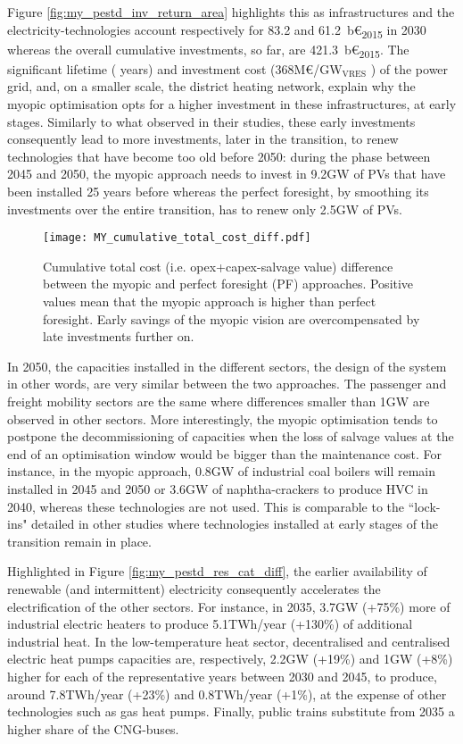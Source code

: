 Figure \ref{fig:my_pestd_inv_return_area} highlights this as infrastructures and the electricity-technologies account respectively for 83.2 and 61.2~b€\textsubscript{2015} in 2030 whereas the overall cumulative investments, so far, are 421.3~b€\textsubscript{2015}. The significant lifetime ( years) and investment cost (\ie 368M€/GW$_\text{VRES}$ \cite{readthedocs_pathway}) of the power grid, and, on a smaller scale, the district heating network, explain why the myopic optimisation opts for a higher investment in these infrastructures, at early stages. Similarly to what \citet{keppo2010short} observed in their studies, these early investments consequently lead to more investments, later in the transition, to renew technologies that have become too old before 2050: during the phase between 2045 and 2050, the myopic approach needs to invest in 9.2GW of PVs that have been installed 25 years before whereas the perfect foresight, by smoothing its investments over the entire transition, has to renew only 2.5GW of PVs. 

\begin{figure}[!htbp]
\centering
\texttt{[image: MY\_cumulative\_total\_cost\_diff.pdf]}
\caption{Cumulative total cost (i.e. opex+capex-salvage value) difference between the myopic and perfect foresight (PF) approaches. Positive values mean that the myopic approach is higher than perfect foresight. Early savings of the myopic vision are overcompensated by late investments further on.}
\label{fig:my_pestd_total_cost_cum_diff}
\end{figure}

In 2050, the capacities installed in the different sectors, the design of the system in other words, are very similar between the two approaches. The passenger and freight mobility sectors are the same where differences smaller than 1GW are observed in other sectors. More interestingly, the myopic optimisation tends to postpone the decommissioning of capacities when the loss of salvage values at the end of an optimisation window would be bigger than the maintenance cost. For instance, in the myopic approach, 0.8GW of industrial coal boilers will remain installed in 2045 and 2050 or 3.6GW of naphtha-crackers to produce HVC in 2040, whereas these technologies are not used. This is comparable to the ``lock-ins" detailed in other studies \cite{heuberger2018impact,keppo2010short} where technologies installed at early stages of the transition remain in place.

Highlighted in Figure \ref{fig:my_pestd_res_cat_diff}, the earlier availability of renewable (and intermittent) electricity consequently accelerates the electrification of the other sectors. For instance, in 2035, 3.7GW (+75\%) more of industrial electric heaters to produce 5.1TWh/year (+130\%) of additional industrial heat. In the low-temperature heat sector, decentralised and centralised electric heat pumps capacities are, respectively, 2.2GW (+19\%) and 1GW (+8\%) higher for each of the representative years between 2030 and 2045, to produce, around 7.8TWh/year (+23\%) and 0.8TWh/year (+1\%), at the expense of other technologies such as gas heat pumps. Finally, public trains substitute from 2035 a higher share of the CNG-buses.

